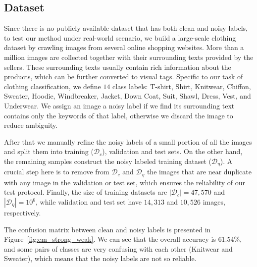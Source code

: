 \documentclass[10pt,twocolumn,letterpaper]{article}
\begin{document}
\subsection{Dataset} %
\label{sub:dataset}
Since there is no publicly available dataset that has both clean and noisy labels, to test our method under real-world scenario, we build a large-scale clothing dataset by crawling images from several online shopping websites. More than a million images are collected together with their surrounding texts provided by the sellers. These surrounding texts usually contain rich information about the products, which can be further converted to visual tags. Specific to our task of clothing classification, we define $14$ class labels: T-shirt, Shirt, Knitwear, Chiffon, Sweater, Hoodie, Windbreaker, Jacket, Down Coat, Suit, Shawl, Dress, Vest, and Underwear. We assign an image a noisy label if we find its surrounding text contains only the keywords of that label, otherwise we discard the image to reduce ambiguity.

After that we manually refine the noisy labels of a small portion of all the images and split them into training ($\mathcal{D}_c$), validation and test sets. On the other hand, the remaining samples construct the noisy labeled training dataset ($\mathcal{D}_{\eta}$). A crucial step here is to remove from $\mathcal{D}_c$ and $\mathcal{D}_{\eta}$ the images that are near duplicate with any image in the validation or test set, which ensures the reliability of our test protocol. Finally, the size of training datasets are $|\mathcal{D}_c| = 47,570$ and $|\mathcal{D}_{\eta}| = 10^6$, while validation and test set have $14,313$ and $10,526$ images, respectively.

The confusion matrix between clean and noisy labels is presented in Figure~\ref{fig:cm_strong_weak}. We can see that the overall accuracy is $61.54\%$, and some pairs of classes are very confusing with each other (\eg Knitwear and Sweater), which means that the noisy labels are not so reliable.
\end{document}
